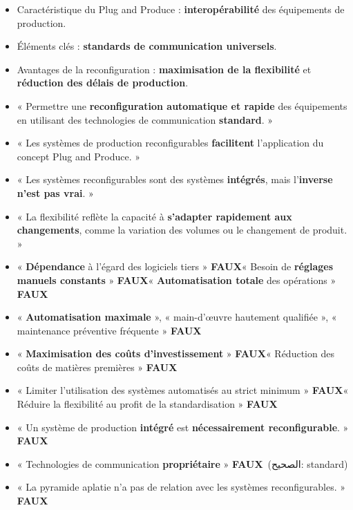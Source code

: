\documentclass[11pt,a4paper]{article}
\newcommand{\ar}[1]{\textarabic{#1}}
\newcommand{\fr}[1]{\textfrench{#1}}
\newcommand{\faux}{\textcolor{rouge}{\textbf{FAUX}}}
\begin{document}
\begin{examen}
\begin{itemize}
\item Caractéristique du Plug and Produce : \textbf{interopérabilité} des équipements de production.
\item Éléments clés : \textbf{standards de communication universels}.
\item Avantages de la reconfiguration : \textbf{maximisation de la flexibilité} et \textbf{réduction des délais de production}.
\item « Permettre une \textbf{reconfiguration automatique et rapide} des équipements en utilisant des technologies de communication \textbf{standard}. »
\item « Les systèmes de production reconfigurables \textbf{facilitent} l'application du concept Plug and Produce. »
\item « Les systèmes reconfigurables sont des systèmes \textbf{intégrés}, mais l'\textbf{inverse n'est pas vrai}. »
\item « La flexibilité reflète la capacité à \textbf{s'adapter rapidement aux changements}, comme la variation des volumes ou le changement de produit. »
\end{itemize}
\end{examen}
\begin{piege}
\begin{itemize}
\item « \textbf{Dépendance} à l'égard des logiciels tiers » \faux \quad « Besoin de \textbf{réglages manuels constants} » \faux \quad « \textbf{Automatisation totale} des opérations » \faux
\item « \textbf{Automatisation maximale} », « main-d'œuvre hautement qualifiée », « maintenance préventive fréquente » \faux
\item « \textbf{Maximisation des coûts d'investissement} » \faux \quad « Réduction des coûts de matières premières » \faux
\item « Limiter l'utilisation des systèmes automatisés au strict minimum » \faux \quad « Réduire la flexibilité au profit de la standardisation » \faux
\item « Un système de production \textbf{intégré} est \textbf{nécessairement reconfigurable}. » \faux
\item « Technologies de communication \textbf{propriétaire} » \faux \ \ar{(الصحيح: \fr{standard})}
\item « La pyramide aplatie n'a pas de relation avec les systèmes reconfigurables. » \faux
\end{itemize}
\end{piege}
\end{document}
